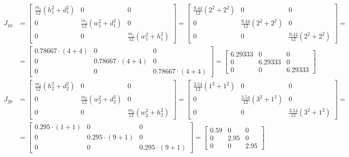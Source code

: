 \documentclass[a4paper]{article}
\begin{document}
	\begin{align*}
		J_{10} &= \begin{bmatrix}
			\frac{m_1}{12}(h_1^2 + d_1^2) & 0 & 0 \\
			0 & \frac{m_1}{12}(w_1^2 + d_1^2) & 0 \\
			0 & 0 & \frac{m_1}{12}(w_1^2 + h_1^2)
		\end{bmatrix} =
		\begin{bmatrix}
			\frac{9.44}{12}(2^2 + 2^2) & 0 & 0 \\
			0 & \frac{9.44}{12}(2^2 + 2^2) & 0 \\
			0 & 0 & \frac{9.44}{12}(2^2 + 2^2)
		\end{bmatrix} =
		\\
		&= \begin{bmatrix}
			0.78667 \cdot (4 + 4) & 0 & 0 \\
			0 & 0.78667 \cdot (4 + 4) & 0 \\
			0 & 0 & 0.78667 \cdot (4 + 4)
		\end{bmatrix} =
		\begin{bmatrix}
			6.29333 & 0 & 0 \\
			0 & 6.29333 & 0 \\
			0 & 0 & 6.29333
		\end{bmatrix}
		\\
		J_{20} &= \begin{bmatrix}
			\frac{m_2}{12}(h_2^2 + d_2^2) & 0 & 0 \\
			0 & \frac{m_2}{12}(w_2^2 + d_2^2) & 0 \\
			0 & 0 & \frac{m_2}{12}(w_2^2 + h_2^2)
		\end{bmatrix} =
		\begin{bmatrix}
			\frac{3.54}{12}(1^2 + 1^2) & 0 & 0 \\
			0 & \frac{3.54}{12}(3^2 + 1^2) & 0 \\
			0 & 0 & \frac{3.54}{12}(3^2 + 1^2)
		\end{bmatrix} =
		\\
		&=\begin{bmatrix}
			0.295 \cdot (1 + 1) & 0 & 0 \\
			0 & 0.295 \cdot (9 + 1) & 0 \\
			0 & 0 & 0.295 \cdot (9 + 1)
		\end{bmatrix} =
		\begin{bmatrix}
			0.59 & 0 & 0 \\
			0 & 2.95 & 0 \\
			0 & 0 & 2.95
		\end{bmatrix}
		\\

\end{align*}
\end{document}
